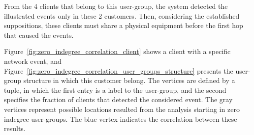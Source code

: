 From the 4 clients that belong to this user-group, the system
detected the illustrated events only in these 2 customers.
Then, considering the established suppositions,
these clients must share a physical equipment before the
first hop that caused the events.

Figure~\ref{fig:zero_indegree_correlation_client} shows a client with a
specific network event, and
Figure~\ref{fig:zero_indegree_correlation_user_groups_structure} presents the
user-group structure in which this customer belong.
The vertices are defined by a tuple, in which the first entry is a
label to the user-group, and the second specifies the fraction of clients
that detected the considered event.
The gray vertices represent
possible locations resulted from the analysis starting in zero indegree
user-groups.
The blue vertex indicates the correlation between these results.

